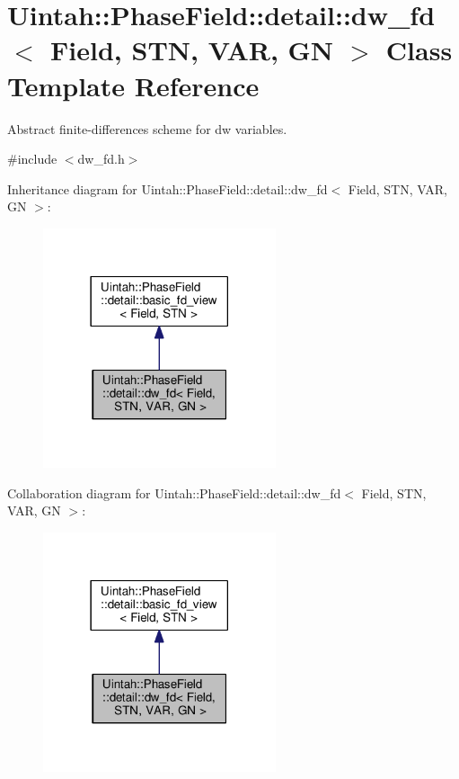 \hypertarget{classUintah_1_1PhaseField_1_1detail_1_1dw__fd}{}\section{Uintah\+:\+:Phase\+Field\+:\+:detail\+:\+:dw\+\_\+fd$<$ Field, S\+TN, V\+AR, GN $>$ Class Template Reference}
\label{classUintah_1_1PhaseField_1_1detail_1_1dw__fd}


Abstract finite-\/differences scheme for dw variables.  




{\ttfamily \#include $<$dw\+\_\+fd.\+h$>$}



Inheritance diagram for Uintah\+:\+:Phase\+Field\+:\+:detail\+:\+:dw\+\_\+fd$<$ Field, S\+TN, V\+AR, GN $>$\+:\nopagebreak
\begin{figure}[H]
\begin{center}
\leavevmode
\includegraphics[width=194pt]{classUintah_1_1PhaseField_1_1detail_1_1dw__fd__inherit__graph}
\end{center}
\end{figure}


Collaboration diagram for Uintah\+:\+:Phase\+Field\+:\+:detail\+:\+:dw\+\_\+fd$<$ Field, S\+TN, V\+AR, GN $>$\+:\nopagebreak
\begin{figure}[H]
\begin{center}
\leavevmode
\includegraphics[width=194pt]{classUintah_1_1PhaseField_1_1detail_1_1dw__fd__coll__graph}
\end{center}
\end{figure}


